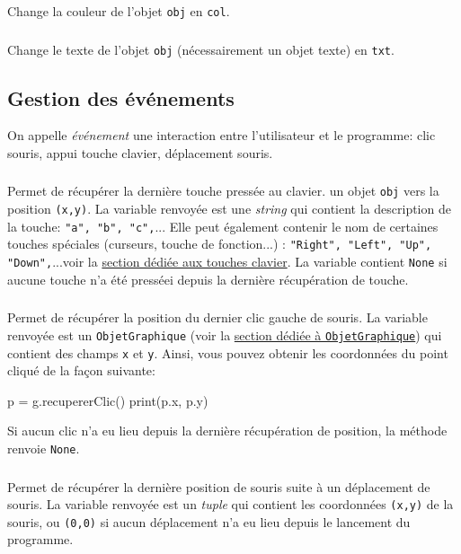 \documentclass[11pt,a4paper]{article}
\begin{document}
\subsubsection*{}
Change la couleur de l'objet {\tt obj} en {\tt col}.

\subsubsection*{}
Change le texte de l'objet {\tt obj} (nécessairement un objet texte) en {\tt txt}.

\newpage
\subsection*{Gestion des événements}
On appelle {\it événement} une interaction entre l'utilisateur et le programme: clic souris, appui touche clavier, déplacement souris.

\subsubsection*{}
Permet de récupérer la dernière touche pressée au clavier. un objet {\tt obj} vers la position {\tt (x,y)}. La variable renvoyée est une {\it string} qui contient la description de la touche: {\tt "a", "b", "c",}... Elle peut également contenir le nom de certaines touches spéciales (curseurs, touche de fonction...) : {\tt "Right", "Left", "Up", "Down",}...voir la \underline{section dédiée aux touches clavier}. La variable contient {\tt None} si aucune touche n'a été presséei depuis la dernière récupération de touche.

\subsubsection*{}
Permet de récupérer la position du dernier clic gauche de souris. La variable renvoyée est un {\tt ObjetGraphique} (voir la \underline{section dédiée à {\tt ObjetGraphique}}) qui contient des champs {\tt x} et {\tt y}. Ainsi, vous pouvez obtenir les coordonnées du point cliqué de la façon suivante:
\begin{ccode}
    p = g.recupererClic()
    print(p.x, p.y)
\end{ccode}
Si aucun clic n'a eu lieu depuis la dernière récupération de position, la méthode renvoie {\tt None}.

\subsubsection*{}
Permet de récupérer la dernière position de souris suite à un déplacement de souris. La variable renvoyée est un {\it tuple} qui contient les coordonnées {\tt (x,y)} de la souris, ou {\tt (0,0)} si aucun déplacement n'a eu lieu depuis le lancement du programme.
\end{document}
